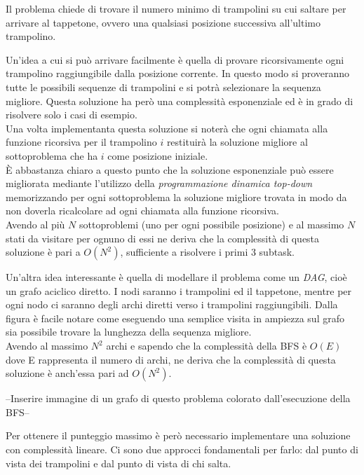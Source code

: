 
Il problema chiede di trovare il numero minimo di trampolini su cui saltare per arrivare al tappetone, ovvero una qualsiasi posizione successiva all'ultimo trampolino.

\Nquadra
Un'idea a cui si può arrivare facilmente è quella di provare ricorsivamente ogni trampolino raggiungibile dalla posizione corrente. In questo modo si proveranno tutte le possibili sequenze di trampolini e si potrà selezionare la sequenza migliore. Questa soluzione ha però una complessità esponenziale ed è in grado di risolvere solo i casi di esempio.\\
Una volta implementanta questa soluzione si noterà che ogni chiamata alla funzione ricorsiva per il trampolino $i$ restituirà la soluzione migliore al sottoproblema che ha $i$ come posizione iniziale. \\È abbastanza chiaro a questo punto che la soluzione esponenziale può essere migliorata mediante l'utilizzo della \textit{programmazione dinamica top-down} memorizzando per ogni sottoproblema la soluzione migliore trovata in modo da non doverla ricalcolare ad ogni chiamata alla funzione ricorsiva.\\
Avendo al più $N$ sottoproblemi (uno per ogni possibile posizione) e al massimo $N$ stati da visitare per ognuno di essi ne deriva che la complessità di questa soluzione è pari a $O(N^2)$, sufficiente a risolvere i primi 3 subtask.

Un'altra idea interessante è quella di modellare il problema come un \textit{DAG}, cioè un grafo aciclico diretto. I nodi saranno i trampolini ed il tappetone, mentre per ogni nodo ci saranno degli archi diretti verso i trampolini raggiungibili. Dalla figura è facile notare come eseguendo una semplice visita in ampiezza sul grafo sia possibile trovare la lunghezza della sequenza migliore. \\
Avendo al massimo $N^2$ archi e sapendo che la complessità della BFS è $O(E)$ dove E rappresenta il numero di archi, ne deriva che la complessità di questa soluzione è anch'essa pari ad $O(N^2)$.

--Inserire immagine di un grafo di questo problema colorato dall'esecuzione della BFS--

\Lineare
Per ottenere il punteggio massimo è però necessario implementare una soluzione con complessità lineare. Ci sono due approcci fondamentali per farlo: dal punto di vista dei trampolini e dal punto di vista di chi salta.

